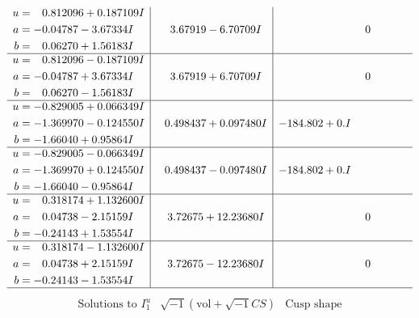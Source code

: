 \documentclass[1p]{elsarticle_modified}
\theoremstyle{definition}
\newcommand{\I}{\sqrt{-1}}
\begin{document}
$$\begin{array}{c|c|c}
\begin{aligned}
u &= \phantom{-}0.812096 + 0.187109 I \\
a &= -0.04787 - 3.67334 I \\
b &= \phantom{-}0.06270 + 1.56183 I\end{aligned}
 & \phantom{-}3.67919 - 6.70709 I & \phantom{-0.000000 } 0 \\ \hline\begin{aligned}
u &= \phantom{-}0.812096 - 0.187109 I \\
a &= -0.04787 + 3.67334 I \\
b &= \phantom{-}0.06270 - 1.56183 I\end{aligned}
 & \phantom{-}3.67919 + 6.70709 I & \phantom{-0.000000 } 0 \\ \hline\begin{aligned}
u &= -0.829005 + 0.066349 I \\
a &= -1.369970 - 0.124550 I \\
b &= -1.66040 + 0.95864 I\end{aligned}
 & \phantom{-}0.498437 + 0.097480 I & -184.802 + 0. I\phantom{ +0.000000I} \\ \hline\begin{aligned}
u &= -0.829005 - 0.066349 I \\
a &= -1.369970 + 0.124550 I \\
b &= -1.66040 - 0.95864 I\end{aligned}
 & \phantom{-}0.498437 - 0.097480 I & -184.802 + 0. I\phantom{ +0.000000I} \\ \hline\begin{aligned}
u &= \phantom{-}0.318174 + 1.132600 I \\
a &= \phantom{-}0.04738 - 2.15159 I \\
b &= -0.24143 + 1.53554 I\end{aligned}
 & \phantom{-}3.72675 + 12.23680 I & \phantom{-0.000000 } 0 \\ \hline\begin{aligned}
u &= \phantom{-}0.318174 - 1.132600 I \\
a &= \phantom{-}0.04738 + 2.15159 I \\
b &= -0.24143 - 1.53554 I\end{aligned}
 & \phantom{-}3.72675 - 12.23680 I & \phantom{-0.000000 } 0\\
 \hline 
 \end{array}$$\newpage$$\begin{array}{c|c|c}  
\text{Solutions to }I^u_{1}& \I (\text{vol} + \sqrt{-1}CS) & \text{Cusp shape}\\

\end{array}$$
\end{document}
